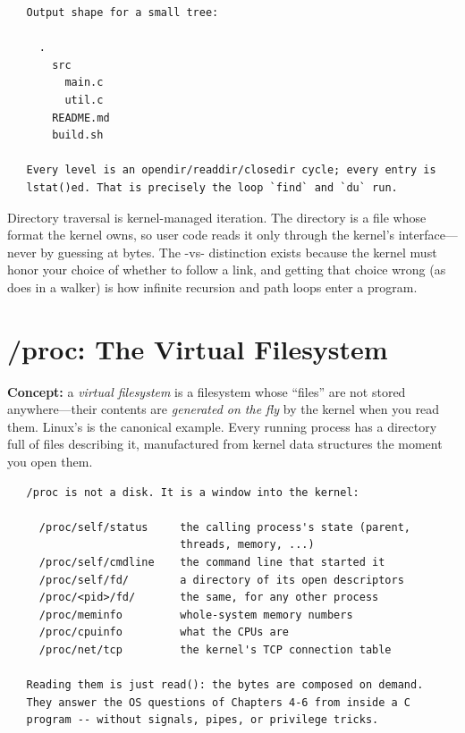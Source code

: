 \begin{verbatim}
   Output shape for a small tree:

     .
       src
         main.c
         util.c
       README.md
       build.sh

   Every level is an opendir/readdir/closedir cycle; every entry is
   lstat()ed. That is precisely the loop `find` and `du` run.
\end{verbatim}

\begin{osconcept}
Directory traversal is kernel-managed iteration. The directory is a
file whose format the kernel owns, so user code reads it only through
the kernel's  interface---never by guessing at bytes.
The -vs- distinction exists because the kernel
must honor your choice of whether to follow a link, and getting that
choice wrong (as  does in a walker) is how infinite
recursion and path loops enter a program.
\end{osconcept}

\section{/proc: The Virtual Filesystem}

\textbf{Concept:} a \emph{virtual filesystem} is a filesystem whose
``files'' are not stored anywhere---their contents are \emph{generated
on the fly} by the kernel when you read them. Linux's  is
the canonical example. Every running process has a directory
 full of files describing it, manufactured from
kernel data structures the moment you open them.

\begin{verbatim}
   /proc is not a disk. It is a window into the kernel:

     /proc/self/status     the calling process's state (parent,
                           threads, memory, ...)
     /proc/self/cmdline    the command line that started it
     /proc/self/fd/        a directory of its open descriptors
     /proc/<pid>/fd/       the same, for any other process
     /proc/meminfo         whole-system memory numbers
     /proc/cpuinfo         what the CPUs are
     /proc/net/tcp         the kernel's TCP connection table

   Reading them is just read(): the bytes are composed on demand.
   They answer the OS questions of Chapters 4-6 from inside a C
   program -- without signals, pipes, or privilege tricks.
\end{verbatim}

